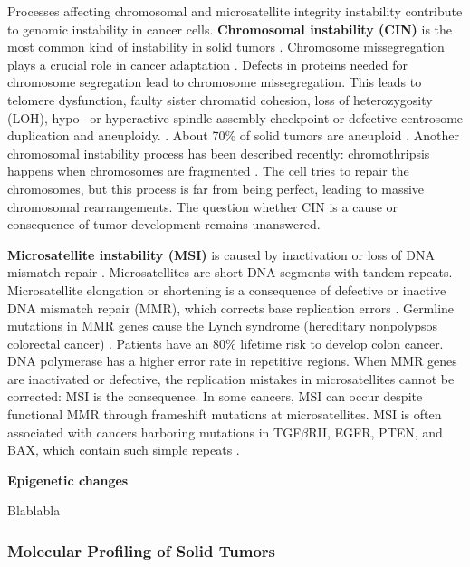     Processes affecting chromosomal and microsatellite integrity instability
    contribute to genomic instability in cancer cells. \textbf{Chromosomal
    instability (CIN)} is the most common kind of instability in solid tumors
    {\cite{cin_crc}}. Chromosome missegregation plays a crucial role in cancer
    adaptation {\cite{chromosome_missegregation}}. Defects in proteins needed
    for chromosome segregation lead to chromosome missegregation. This leads to
    telomere dysfunction,  faulty sister chromatid cohesion, loss of
    heterozygosity (LOH), hypo-- or hyperactive spindle assembly checkpoint or
    defective centrosome duplication and aneuploidy. {\cite{cin_crc}}. About
    70\% of solid tumors are aneuploid {\cite{aneuploidy}}. Another chromosomal
    instability process has been described recently: chromothripsis happens when
    chromosomes are fragmented {\cite{chromothripsis_1}}
    {\cite{chromothripsis_2}} {\cite{chromothripsis_2}}. The cell tries to
    repair the chromosomes, but this process is far from being perfect, leading
    to massive chromosomal rearrangements. The question whether CIN is a cause
    or consequence of tumor development remains unanswered.

    \textbf{Microsatellite instability (MSI)} is caused by inactivation or loss
    of DNA mismatch repair {\cite{msi}}. Microsatellites are short DNA segments
    with tandem repeats. Microsatellite elongation or shortening is a
    consequence of defective or inactive DNA mismatch repair (MMR), which
    corrects base replication errors {\cite{cin_crc}}. Germline mutations in MMR
    genes cause the Lynch syndrome (hereditary nonpolypsos colorectal cancer)
    {\cite{lynch}}. Patients have an 80\% lifetime risk to develop colon cancer.
    DNA polymerase has a higher error rate in repetitive regions. When MMR genes
    are inactivated or defective, the replication mistakes in microsatellites
    cannot be corrected: MSI is the consequence. In some cancers, MSI can occur
    despite functional MMR through frameshift mutations at microsatellites. MSI
    is often associated with cancers harboring mutations in TGF$\beta$RII, EGFR,
    PTEN, and BAX, which contain such simple repeats {\cite{micro}}.

    \textbf{Epigenetic changes}

    Blablabla

    \subsubsection{Molecular Profiling of Solid Tumors}


